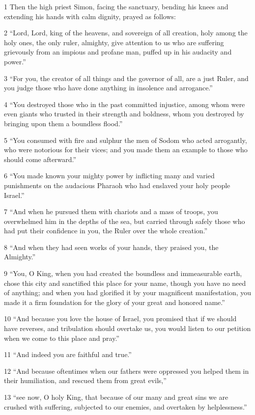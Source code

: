 \par 1 Then the high priest Simon, facing the sanctuary, bending his knees and extending his hands with calm dignity, prayed as follows:
\par 2 “Lord, Lord, king of the heavens, and sovereign of all creation, holy among the holy ones, the only ruler, almighty, give attention to us who are suffering grievously from an impious and profane man, puffed up in his audacity and power.”
\par 3 “For you, the creator of all things and the governor of all, are a just Ruler, and you judge those who have done anything in insolence and arrogance.”
\par 4 “You destroyed those who in the past committed injustice, among whom were even giants who trusted in their strength and boldness, whom you destroyed by bringing upon them a boundless flood.”
\par 5 “You consumed with fire and sulphur the men of Sodom who acted arrogantly, who were notorious for their vices; and you made them an example to those who should come afterward.”
\par 6 “You made known your mighty power by inflicting many and varied punishments on the audacious Pharaoh who had enslaved your holy people Israel.”
\par 7 “And when he pursued them with chariots and a mass of troops, you overwhelmed him in the depths of the sea, but carried through safely those who had put their confidence in you, the Ruler over the whole creation.”
\par 8 “And when they had seen works of your hands, they praised you, the Almighty.”
\par 9 “You, O King, when you had created the boundless and immeasurable earth, chose this city and sanctified this place for your name, though you have no need of anything; and when you had glorified it by your magnificent manifestation, you made it a firm foundation for the glory of your great and honored name.”
\par 10 “And because you love the house of Israel, you promised that if we should have reverses, and tribulation should overtake us, you would listen to our petition when we come to this place and pray.”
\par 11 “And indeed you are faithful and true.”
\par 12 “And because oftentimes when our fathers were oppressed you helped them in their humiliation, and rescued them from great evils,”
\par 13 “see now, O holy King, that because of our many and great sins we are crushed with suffering, subjected to our enemies, and overtaken by helplessness.”
